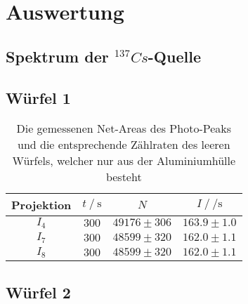 \section{Auswertung}
\label{sec:Auswertung}


\subsection{Spektrum der $^{137}Cs$-Quelle}

\subsection{Würfel 1}


\begin{table}[H]
  \centering
  \begin{tabular}{c c c c}
    \toprule
     Projektion &  $t \:/\: \si{\second}$ &                   $N$ &           $I \:/\: \si{\per\second}$ \\
    \midrule
              $I_{4}$ &   $300$ & $49176\pm 306$ & $163.9\pm 1.0$ \\
              $I_{7}$ &   $300$ & $48599\pm 320$ & $162.0\pm 1.1$ \\
              $I_{8}$ &   $300$ & $48599\pm 320$ & $162.0\pm 1.1$ \\
    \bottomrule
  \end{tabular}
  \caption{Die gemessenen Net-Areas des Photo-Peaks und die entsprechende Zählraten des leeren Würfels, welcher nur aus der Aluminiumhülle besteht}
  \label{tab:w1}
\end{table}

\subsection{Würfel 2}

